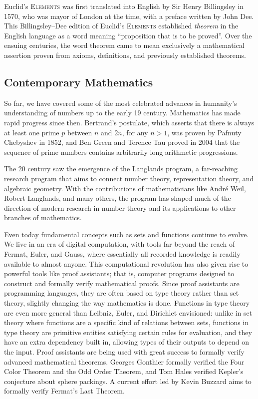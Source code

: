 Euclid's \textsc{Elements} was first translated into English by Sir Henry Billingsley in 1570, who was mayor of London at the time, with a preface written by John Dee. This Billingsley--Dee edition of Euclid’s \textsc{Elements} established \emph{theorem} in the English language as a word meaning “proposition that is to be proved”. Over the ensuing centuries, the word theorem came to mean exclusively a mathematical assertion proven from axioms, definitions, and previously established theorems.

\subsection{Contemporary Mathematics}

So far, we have covered some of the most celebrated advances in humanity's understanding of numbers up to the early 19\supth{} century. Mathematics has made rapid progress since then. Bertrand's postulate, which asserts that there is always at least one prime $p$ between $n$ and $2n$, for any $n>1$, was proven by Pafnuty Chebyshev in 1852, and Ben Green and Terence Tau proved in 2004 that the sequence of prime numbers contains arbitrarily long arithmetic progressions.

The 20\supth{} century saw the emergence of the Langlands program, a far-reaching research program that aims to connect number theory, representation theory, and algebraic geometry. With the contributions of mathematicians like André Weil, Robert Langlands, and many others, the program has shaped much of the direction of modern research in number theory and its applications to other branches of mathematics.

Even today fundamental concepts such as sets and functions continue to evolve. We live in an era of digital computation, with tools far beyond the reach of Fermat, Euler, and Gauss, where essentially all recorded knowledge is readily available to almost anyone. This computational revolution has also given rise to powerful tools like proof assistants; that is, computer programs designed to construct and formally verify mathematical proofs. Since proof assistants are programming languages, they are often based on type theory rather than set theory, slightly changing the way mathematics is done. Functions in type theory are even more general than Leibniz, Euler, and Dirichlet envisioned: unlike in set theory where functions are a specific kind of relations between sets, functions in type theory are primitive entities satisfying certain rules for evaluation, and they have an extra dependency built in, allowing types of their outputs to depend on the input. Proof assistants are being used with great success to formally verify advanced mathematical theorems. Georges Gonthier formally verified the Four Color Theorem and the Odd Order Theorem, and Tom Hales verified Kepler's conjecture about sphere packings. A current effort led by Kevin Buzzard aims to formally verify Fermat's Last Theorem.

